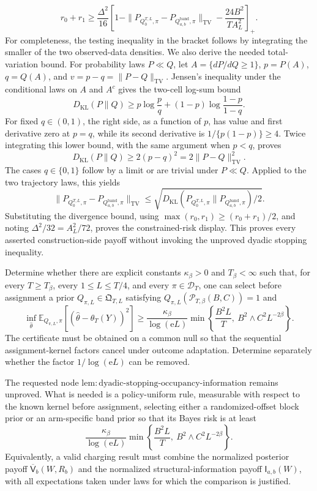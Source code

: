\[
 r_0+r_1
 \ge\frac{\Delta^2}{16}
 \left[1-\|P_{Q_0^{T,L},\pi}-P_{Q_{a,b}^{\mathrm{band}},\pi}\|_{\mathrm{TV}}
 -\frac{24B^2}{TA_L^2}\right]_+.
\]
For completeness, the testing inequality in the bracket follows by integrating the smaller of the two observed-data densities.  We also derive the needed total-variation bound.  For probability laws \(P\ll Q\), let \(A=\{dP/dQ\ge1\}\), \(p=P(A)\), \(q=Q(A)\), and \(v=p-q=\|P-Q\|_{\mathrm{TV}}\).  Jensen's inequality under the conditional laws on \(A\) and \(A^c\) gives the two-cell log-sum bound
\[
 D_{\mathrm{KL}}(P\|Q)
 \ge p\log\frac pq+(1-p)\log\frac{1-p}{1-q}.
\]
For fixed \(q\in(0,1)\), the right side, as a function of \(p\), has value and first derivative zero at \(p=q\), while its second derivative is
\(1/\{p(1-p)\}\ge4\).  Twice integrating this lower bound, with the same argument when \(p<q\), proves
\[
 D_{\mathrm{KL}}(P\|Q)\ge2(p-q)^2=2\|P-Q\|_{\mathrm{TV}}^2.
\]
The cases \(q\in\{0,1\}\) follow by a limit or are trivial under \(P\ll Q\).  Applied to the two trajectory laws, this yields
\[
 \|P_{Q_0^{T,L},\pi}-P_{Q_{a,b}^{\mathrm{band}},\pi}\|_{\mathrm{TV}}
 \le\sqrt{D_{\mathrm{KL}}(P_{Q_0^{T,L},\pi}\|P_{Q_{a,b}^{\mathrm{band}},\pi})/2}.
\]
Substituting the divergence bound, using \(\max(r_0,r_1)\ge(r_0+r_1)/2\), and noting \(\Delta^2/32=A_L^2/72\), proves the constrained-risk display.  This proves every asserted construction-side payoff without invoking the unproved dyadic stopping inequality.

Determine whether there are explicit constants \(\kappa_\beta>0\) and \(T_\beta<\infty\) such that, for every \(T\ge T_\beta\), every \(1\le L\le T/4\), and every \(\pi\in\mathcal D_T\), one can select before assignment a prior \(Q_{\pi,L}\in\mathfrak Q_{T,L}\) satisfying \(Q_{\pi,L}(\mathcal P_{T,\beta}(B,C))=1\) and
\[
 \inf_{\widehat\theta}\mathbb E_{Q_{\pi,L},\pi}
 [ (\widehat\theta-\theta_T(Y))^2]
 \ge\frac{\kappa_\beta}{\log(\mathrm eL)}
 \min\left\{\frac{B^2L}{T},\ B^2\wedge C^2L^{-2\beta}\right\}.
\]
The certificate must be obtained on a common null so that the sequential assignment-kernel factors cancel under outcome adaptation.  Determine separately whether the factor \(1/\log(\mathrm eL)\) can be removed.

The requested node \(\mathrm{lem{:}dyadic\mbox{-}stopping\mbox{-}occupancy\mbox{-}information}\) remains unproved.  What is needed is a policy-uniform rule, measurable with respect to the known kernel before assignment, selecting either a randomized-offset block prior or an arm-specific band prior so that its Bayes risk is at least
\[
 \frac{\kappa_\beta}{\log(\mathrm eL)}
 \min\left\{\frac{B^2L}{T},\ B^2\wedge C^2L^{-2\beta}\right\}.
\]
Equivalently, a valid charging result must combine the normalized posterior payoff \(\overline{\mathsf V}_b(W,R_b)\) and the normalized structural-information payoff \(\mathsf I_{a,b}(W)\), with all expectations taken under laws for which the comparison is justified.

